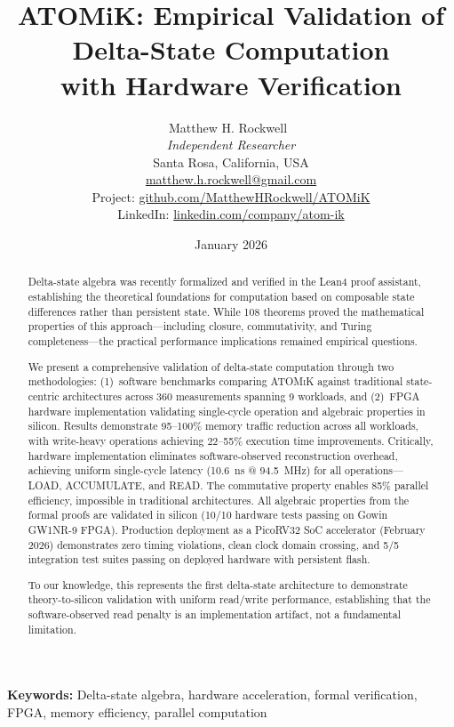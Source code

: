 \documentclass[11pt,letterpaper]{article}
\title{ATOMiK: Empirical Validation of Delta-State Computation\\with Hardware Verification}
\author{
  Matthew H. Rockwell~\orcidlink{0009-0006-6082-5583}\\
  \textit{Independent Researcher}\\
  Santa Rosa, California, USA\\
  \href{mailto:matthew.h.rockwell@gmail.com}{matthew.h.rockwell@gmail.com}\\[1em]
  \small{Project: \href{https://github.com/MatthewHRockwell/ATOMiK}{github.com/MatthewHRockwell/ATOMiK}}\\
  \small{LinkedIn: \href{https://linkedin.com/company/atom-ik}{linkedin.com/company/atom-ik}}
}
\date{January 2026}
\theoremstyle{plain}
\theoremstyle{definition}
\theoremstyle{remark}
\newcommand{\atomik}{\textsc{ATOMiK}}
\begin{document}
\maketitle

\begin{abstract}
Delta-state algebra was recently formalized and verified in the Lean4 proof assistant, establishing the theoretical foundations for computation based on composable state differences rather than persistent state. While 108 theorems proved the mathematical properties of this approach---including closure, commutativity, and Turing completeness---the practical performance implications remained empirical questions.

We present a comprehensive validation of delta-state computation through two methodologies: (1)~software benchmarks comparing \atomik{} against traditional state-centric architectures across 360 measurements spanning 9 workloads, and (2)~FPGA hardware implementation validating single-cycle operation and algebraic properties in silicon. Results demonstrate 95--100\% memory traffic reduction across all workloads, with write-heavy operations achieving 22--55\% execution time improvements. Critically, hardware implementation eliminates software-observed reconstruction overhead, achieving uniform single-cycle latency (10.6~ns @ 94.5~MHz) for all operations---LOAD, ACCUMULATE, and READ. The commutative property enables 85\% parallel efficiency, impossible in traditional architectures. All algebraic properties from the formal proofs are validated in silicon (10/10 hardware tests passing on Gowin GW1NR-9 FPGA). Production deployment as a PicoRV32 SoC accelerator (February 2026) demonstrates zero timing violations, clean clock domain crossing, and 5/5 integration test suites passing on deployed hardware with persistent flash.

To our knowledge, this represents the first delta-state architecture to demonstrate theory-to-silicon validation with uniform read/write performance, establishing that the software-observed read penalty is an implementation artifact, not a fundamental limitation.
\end{abstract}

\vspace{1em}
\noindent\textbf{Keywords:} Delta-state algebra, hardware acceleration, formal verification, FPGA, memory efficiency, parallel computation
\end{document}

